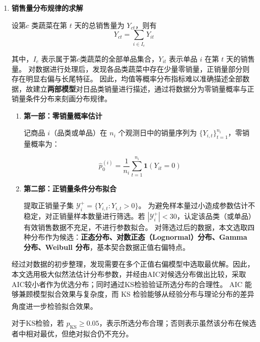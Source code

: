 \documentclass[withoutpreface,bwprint]{cumcmthesis} %
\numberwithin{equation}{section}
\begin{document}
\begin{enumerate}[leftmargin=2em,itemsep=0pt,parsep=0pt,topsep=2pt]
    \item \textbf{销售量分布规律的求解}
    
    \hspace*{2em}设第$c$ 类蔬菜在第 $t$ 天的总销售量为 $Y_{ct}$，则有
\begin{equation}
    Y_{ct}=\sum_{i\in I_c}Y_{it}
\end{equation}

其中，$I_c$ 表示属于第$c$类蔬菜的全部单品集合，$Y_{it}$ 表示单品 $i$ 在第 $t$ 天的销售量。
\hspace*{2em}对数据进行处理后，发现各品类蔬菜中存在少量零销量，正销量部分则存在明显右偏与长尾特征。
因此，均值等概率分布指标难以准确描述全部数据，故建立\textbf{两部模型}对日品类销量进行描述，通过将数据分为零销量概率与正销量条件分布来刻画分布规律。
\begin{enumerate}
    \item \textbf{第一部：零销量概率估计} 

\hspace*{2em}记商品 $i$（品类或单品）在 $n_i$ 个观测日中的销量序列为 $\{Y_{i,t}\}_{t=1}^{n_i}$，零销量概率为：

\begin{equation}
 \hat{p}_{0}^{(i)} = \frac{1}{n_i} \sum_{t=1}^{n_i} \mathbf{1}(Y_{it} = 0) \tag{1}
\end{equation}
    \item \textbf{第二部：正销量条件分布拟合}
    
\hspace*{2em}提取正销量子集 $\mathcal{Y}_i^{+} = \{Y_{i,t} : Y_{i,t} > 0\}$。
为避免样本量过小造成参数估计不稳定，对正销量样本数量进行筛选。若 $|\mathcal{Y}_i^{+}| < 30$，认定该品类（或单品）有效销售数据不充足，不进行参数拟合。
对筛选过后的数据，本文选取四种分布作为候选：\textbf{正态分布、}\textbf{对数正态（Lognormal）分布、}\textbf{Gamma 分布、}\textbf{Weibull 分布}，基本契合数据正值右偏特点。

\end{enumerate}
\hspace*{2em}经过对数据的初步整理，发现需要在多个正值右偏模型中选取最优解。因此，本文选用极大似然法估计分布参数，并经由AIC对候选分布做出比较，采取AIC较小者作为优选分布；同时通过KS检验验证所选分布的合理性。
AIC 能够兼顾模型拟合效果与复杂度，而 KS 检验能够从经验分布与理论分布的差异角度进一步检验拟合效果\textsuperscript{\cite{akaike1974}}。 

\hspace*{2em}对于KS检验，若 $p_{\text{KS}} \geq 0.05$，表示所选分布合理；否则表示虽然该分布在候选者中相对最优，但绝对拟合仍不充分。


\end{enumerate}
\end{document}
